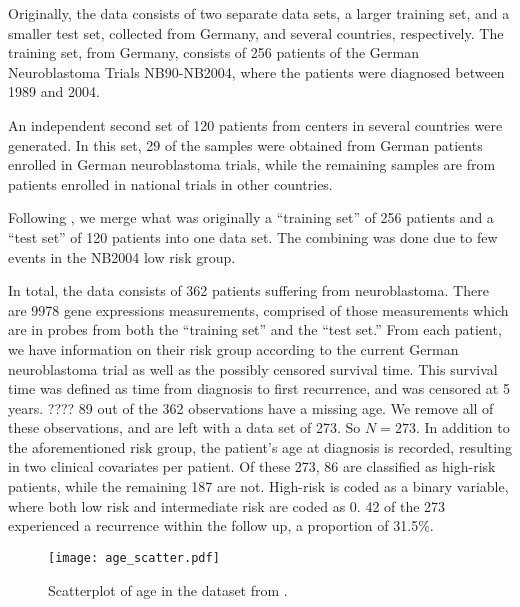 Originally, the data consists of two separate data sets, a larger training set, and a smaller test set, collected from Germany, and several countries, respectively.
The training set, from Germany, consists of 256 patients of the German Neuroblastoma Trials NB90-NB2004, where the patients were diagnosed between 1989 and 2004.

An independent second set of 120 patients from centers in several countries were generated.
In this set, 29 of the samples were obtained from German patients enrolled in German neuroblastoma trials, while the remaining samples are from patients enrolled in national trials in other countries.

Following \citet{bovelstad2009}, we merge what was originally a ``training set'' of 256 patients and a ``test set'' of 120 patients into one data set.
The combining was done due to few events in the NB2004 low risk group.

In total, the data consists of 362 patients suffering from neuroblastoma.
There are 9978 gene expressions measurements, comprised of those measurements which are in probes from both the ``training set'' and the ``test set.''
From each patient, we have information on their risk group according to the current German neuroblastoma trial as well as the possibly censored survival time.
This survival time was defined as time from diagnosis to first recurrence, and was censored at 5 years. ????
89 out of the 362 observations have a missing age.
We remove all of these observations, and are left with a data set of 273.
So $N=273$.
In addition to the aforementioned risk group, the patient's age at diagnosis is recorded, resulting in two clinical covariates per patient.
Of these 273, 86 are classified as high-risk patients, while the remaining 187 are not.
High-risk is coded as a binary variable, where both low risk and intermediate risk are coded as 0.
42 of the 273 experienced a recurrence within the follow up, a proportion of 31.5\%.

\begin{figure}
\caption{Scatterplot of age in the dataset from \citet{oberthuer-data}.}
\label{fig:age-scatter}
\centering\texttt{[image: age\_scatter.pdf]}
\end{figure}

